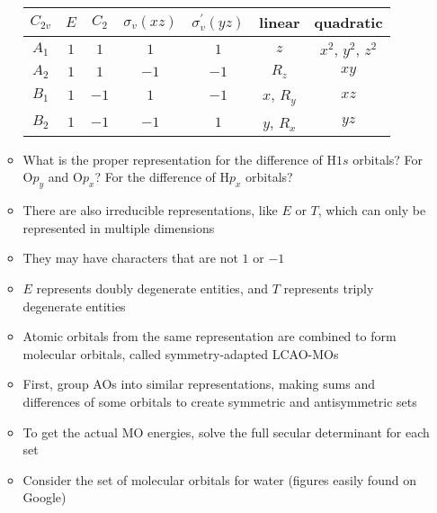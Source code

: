 \documentclass[12pt, openany, letterpaper]{memoir}
\begin{document}
\begin{itemize}
\begin{itemize}
		\begin{tabular}{c|cccc|c|c}
			$C_{2v}$ & $E$ & $C_2$ & $\sigma_v(xz)$ & $\sigma_v^\prime(yz)$ & linear & quadratic \\ \midrule
			$A_1$ & $1$ & $1$ & $1$ & $1$ & $z$& $x^2$, $y^2$, $z^2$ \\
			$A_2$ & $1$ & $1$ & $-1$ & $-1$ & $R_z$ & $xy$\\
			$B_1$ & $1$ & $-1$ & $1$ & $-1$ & $x$, $R_y$ & $xz$ \\
			$B_2$ & $1$ & $-1$ & $-1$ & $1$ & $y$, $R_x$ & $yz$\\
		\end{tabular}
		\item What is the proper representation for the difference of H$1s$ orbitals? For O$p_y$ and O$p_x$? For the difference of H$p_x$ orbitals?
		\item There are also irreducible representations, like $E$ or $T$, which can only be represented in multiple dimensions
		\item They may have characters that are not $1$ or $-1$
		\item $E$ represents doubly degenerate entities, and $T$ represents triply degenerate entities
		\item Atomic orbitals from the same representation are combined to form molecular orbitals, called symmetry-adapted LCAO-MOs
		\item First, group AOs into similar representations, making sums and differences of some orbitals to create symmetric and antisymmetric sets
		\item To get the actual MO energies, solve the full secular determinant for each set
		\item Consider the set of molecular orbitals for water (figures easily found on Google)
	\end{itemize}
\end{itemize}
\end{document}

